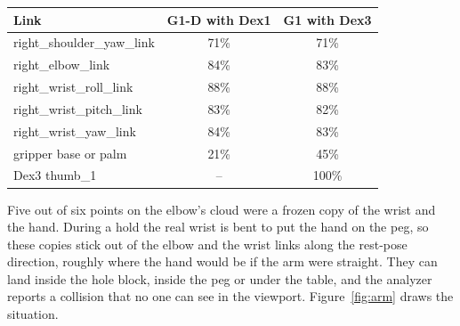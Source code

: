 \begin{mytable}
\small
\begin{tabular}{@{}lcc@{}}
\toprule
Link & G1-D with Dex1 & G1 with Dex3 \\
\midrule
right\_shoulder\_yaw\_link & 71\% & 71\% \\
right\_elbow\_link & 84\% & 83\% \\
right\_wrist\_roll\_link & 88\% & 88\% \\
right\_wrist\_pitch\_link & 83\% & 82\% \\
right\_wrist\_yaw\_link & 84\% & 83\% \\
gripper base or palm & 21\% & 45\% \\
Dex3 thumb\_1 & -- & 100\% \\
\bottomrule
\end{tabular}
\end{mytable}

Five out of six points on the elbow's cloud were a frozen copy of the wrist and the hand. During a hold the real wrist is bent to put the hand on the peg, so these copies stick out of the elbow and the wrist links along the rest-pose direction, roughly where the hand would be if the arm were straight. They can land inside the hole block, inside the peg or under the table, and the analyzer reports a collision that no one can see in the viewport. Figure~\ref{fig:arm} draws the situation.

